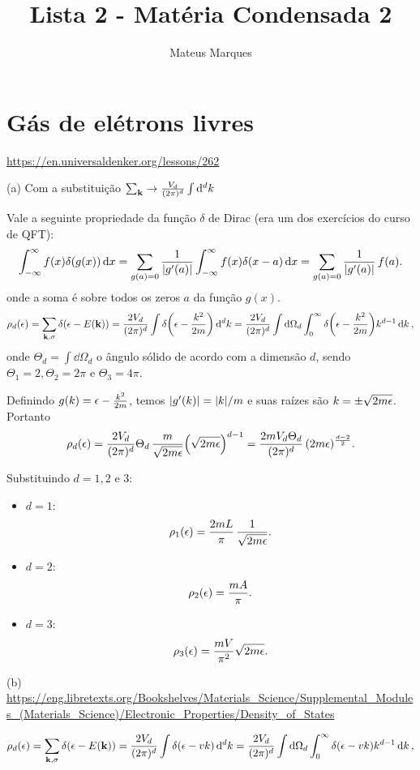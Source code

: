 \documentclass[a4paper,10pt]{article}
\title{\Huge{\textbf{Lista 2 - Matéria Condensada 2}}}
\author{Mateus Marques}
\begin{document}
\maketitle


\section{Gás de elétrons livres}

\url{https://en.universaldenker.org/lessons/262}

(a) Com a substituição $\sum_{\vb{k}} \to \frac{V_d}{(2\pi)^d} \int \dd[d]{k}$

Vale a seguinte propriedade da função $\delta$ de Dirac (era um dos exercícios do curso de QFT):
$$
\int_{-\infty}^{\infty} f(x) \delta(g(x)) \dd{x} =
\sum_{g(a)=0} \frac{1}{\abs{g'(a)}} \int_{-\infty}^{\infty} f(x) \delta(x-a) \dd{x}=
\sum_{g(a)=0} \frac{1}{\abs{g'(a)}} \, f(a).
$$
onde a soma é sobre todos os zeros $a$ da função $g(x)$.
$$
\rho_d(\epsilon) = \sum_{\vb{k}, \sigma} \delta(\epsilon - E(\vb{k})) =
\frac{2V_d}{(2\pi)^d} \int \delta\qty(\epsilon - \frac{k^2}{2m}) \dd[d]{k} =
\frac{2V_d}{(2\pi)^d} \int \dd{\Omega_d} \int_0^\infty \delta\qty(\epsilon - \frac{k^2}{2m}) k^{d-1} \dd{k},
$$
onde $\Theta_d = \int \dd{\Omega_d}$ o ângulo sólido de acordo com a dimensão $d$, sendo $\Theta_1 = 2, \Theta_2 = 2\pi$ e $\Theta_3 = 4\pi$.

Definindo $g(k) = \epsilon - \frac{k^2}{2m}$, temos $\abs{g'(k)} = \abs{k} / m$ e suas raízes são $k = \pm \sqrt{2m \epsilon}$. Portanto
$$
\rho_d(\epsilon) = \frac{2V_d}{(2\pi)^d} \Theta_d \, \frac{m}{\sqrt{2m\epsilon}}
\qty(\sqrt{2m \epsilon})^{d-1} = \frac{2 m V_d \Theta_d}{(2\pi)^d} \, (2m\epsilon)^{\frac{d-2}{2}}.
$$

Substituindo $d = 1, 2$ e $3$:
\begin{itemize}
\item $d = 1$:
$$
\rho_1(\epsilon) = \frac{2 m L}{\pi} \, \frac{1}{\sqrt{2m\epsilon}}.
$$
\item $d = 2$:
$$
\rho_2(\epsilon) = \frac{m A}{\pi}.
$$
\item $d = 3$:
$$
\rho_3(\epsilon) = \frac{m V}{\pi^2} \sqrt{2m\epsilon}.
$$
\end{itemize}

(b) \url{https://eng.libretexts.org/Bookshelves/Materials_Science/Supplemental_Modules_(Materials_Science)/Electronic_Properties/Density_of_States}


$$
\rho_d(\epsilon) = \sum_{\vb{k}, \sigma} \delta(\epsilon - E(\vb{k})) =
\frac{2V_d}{(2\pi)^d} \int \delta\qty(\epsilon - vk) \dd[d]{k} =
\frac{2V_d}{(2\pi)^d} \int \dd{\Omega_d} \int_0^\infty \delta\qty(\epsilon - vk) k^{d-1} \dd{k},
$$
\end{document}
